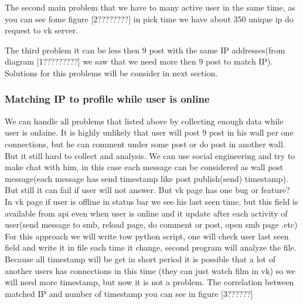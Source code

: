 The second main problem that we have to many active user in the same time, as you can see fome figure [2????????] in pick time we have about 350 unique ip do request to vk server. 

The third problem it can be less then 9 post with the same IP addresses(from diagram [1?????????] we saw that we need more then 9 post to match IP).
Solutions for this problems will be consider in next section.
\begin{figure}
\end{figure}
\subsubsection{Matching IP to profile while user is online}
We can handle all problems that listed above by collecting enough data while user is onlaine. It is highly unlikely that user will post 9 post in his wall per one connections, but he can comment under some post or do post in another wall. But it still hard to collect and  analysis. We can use social engineering and try to make chat with him, in this case each message can be considered as wall post message(each message has send timestamp like post publish(send) timestamp). But still it can fail if user will not answer. But vk page has one bug or feature? In vk page if user is offline in status bar we see his last seen time, but this field is available from api even when user is online and it update after each activity of user(send message to smb, reload page, do comment or post, open smb page .etc)
For this approach we will write tow python script, one will check user last seen field and write it in file each time it change, second program will analyze the file. Because all timestamp will be get in short period it is possible that a lot of another users has connections in this time (they can just watch film in vk) so we will need more timestamp, but now it is not a problem. The correlation between matched IP and number of timestamp you can see in figure [3??????]


